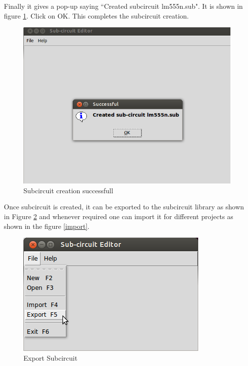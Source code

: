 Finally it gives a pop-up saying ``Created subcircuit lm555n.sub". It is shown in figure \ref{done}. Click on OK. This completes the subcircuit creation. 

\begin{figure}[t]%
\begin{center}
\includegraphics[width=0.5\linewidth]{figures/subcircuit-created.png}%
\caption{Subcircuit creation successfull}
\label{done}
\end{center}
\end{figure}

Once subcircuit is created, it can be exported to the subcircuit library as shown in Figure \ref{exp} and whenever required one can import it for different projects as shown in the figure \ref{import}.

\begin{figure}[t]%
\begin{center}
\includegraphics[width=0.5\linewidth]{figures/export-subcircuit.png}%
\caption{Export Subcircuit}
\label{exp}
\end{center}
\end{figure}

